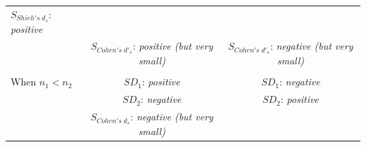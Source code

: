 \documentclass[
  man]{apa6}
\begin{document}
\begin{longtable}[]{@{}lcc@{}}
\begin{minipage}[t]{0.35\columnwidth}
\(S_{Shieh's \; d_s}\): \emph{positive}\strut
\end{minipage}\tabularnewline
\begin{minipage}[t]{0.27\columnwidth}\raggedright
\strut
\end{minipage} & \begin{minipage}[t]{0.29\columnwidth}\centering
\(S_{Cohen's \; d'_s}\): \emph{positive (but very small)}\strut
\end{minipage} & \begin{minipage}[t]{0.35\columnwidth}\centering
\(S_{Cohen's \; d'_s}\): \emph{negative (but very small)}\strut
\end{minipage}\tabularnewline
\begin{minipage}[t]{0.27\columnwidth}\raggedright
\strut
\end{minipage} & \begin{minipage}[t]{0.29\columnwidth}\centering
\strut
\end{minipage} & \begin{minipage}[t]{0.35\columnwidth}\centering
\strut
\end{minipage}\tabularnewline
\begin{minipage}[t]{0.27\columnwidth}\raggedright
When \(n_1<n_2\)\strut
\end{minipage} & \begin{minipage}[t]{0.29\columnwidth}\centering
\(SD_1\): \emph{positive}\strut
\end{minipage} & \begin{minipage}[t]{0.35\columnwidth}\centering
\(SD_1\): \emph{negative}\strut
\end{minipage}\tabularnewline
\begin{minipage}[t]{0.27\columnwidth}\raggedright
\strut
\end{minipage} & \begin{minipage}[t]{0.29\columnwidth}\centering
\(SD_2\): \emph{negative}\strut
\end{minipage} & \begin{minipage}[t]{0.35\columnwidth}\centering
\(SD_2\): \emph{positive}\strut
\end{minipage}\tabularnewline
\begin{minipage}[t]{0.27\columnwidth}\raggedright
\strut
\end{minipage} & \begin{minipage}[t]{0.29\columnwidth}\centering
\(S_{Cohen's \; d_s}\): \emph{negative (but very small)}\strut
\end{minipage} & \begin{minipage}[t]{0.35\columnwidth}\centering

\end{minipage}
\end{longtable}
\end{document}
